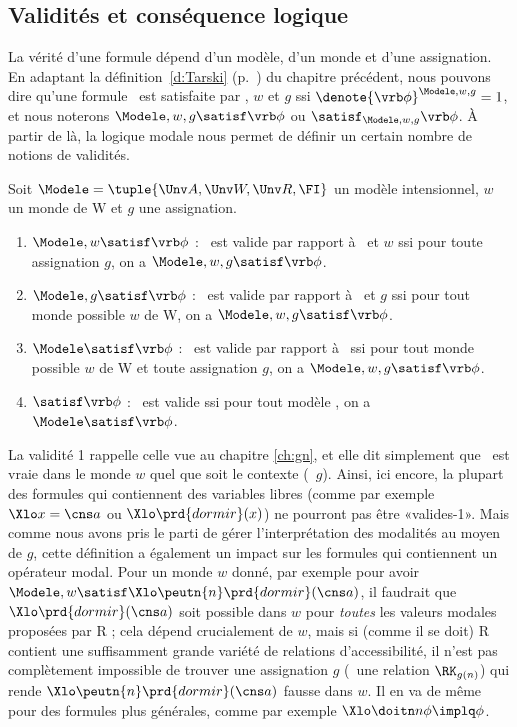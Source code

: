 \subsection{Validités et conséquence logique}
\label{ss:vclw}

La vérité d'une formule dépend d'un modèle, d'un monde et d'une assignation. 
En adaptant la
définition~\ref{d:Tarski} (p.~\pageref{d:Tarski}) du chapitre précédent, nous pouvons dire qu'une formule \vrb\phi\ est satisfaite par \Modele, $w$ et $g$ ssi \(\denote{\vrb\phi}^{\Modele,w,g}=1\), et nous noterons $\Modele,w,g\satisf\vrb\phi$ ou $\satisf_{\Modele,w,g}\vrb\phi$. %
À partir de là, la logique modale nous permet de définir un certain nombre de notions de validités.


\begin{defi}
Soit $\Modele=\tuple{\Unv A,\Unv W,\Unv R,\FI}$ un modèle intensionnel, $w$ un monde de \Unv W et $g$ une assignation.
\begin{enumerate}
\item \(\Modele, w\satisf \vrb\phi\) : \vrb\phi\ est valide par rapport à \Modele\ et $w$ ssi pour toute assignation $g$, on a \(\Modele, w,g\satisf \vrb\phi\).
\item \(\Modele, g\satisf \vrb\phi\) : \vrb\phi\ est valide par rapport à \Modele\ et $g$ ssi pour tout monde possible $w$ de \Unv W, on a \(\Modele, w,g\satisf \vrb\phi\).
\item \(\Modele\satisf \vrb\phi\) : \vrb\phi\ est valide par rapport à \Modele\ ssi pour tout monde possible $w$ de \Unv W et toute assignation $g$, on a \(\Modele, w,g\satisf \vrb\phi\).
\item \(\satisf \vrb\phi\) : \vrb\phi\ est valide  ssi pour tout modèle \Modele, on a \(\Modele\satisf \vrb\phi\).
\end{enumerate}
\end{defi}

\newpage

La validité 1 rappelle celle vue au chapitre \ref{ch:gn}, et elle dit simplement que \vrb\phi\ est vraie dans le monde $w$ quel que soit le contexte (\ie\ $g$).
Ainsi, ici encore, la plupart des formules qui contiennent des variables libres (comme par exemple \(\Xlo x=\cns a\) ou \(\Xlo\prd{dormir}(x)\)) ne pourront pas être «valides-1».  Mais comme nous avons pris le parti de gérer l'interprétation des modalités au moyen de $g$, cette définition a également un impact sur les formules qui contiennent un opérateur modal.  Pour un monde $w$ donné, par exemple pour avoir \(\Modele,w\satisf\Xlo\peutn{n}\prd{dormir}(\cns a)\), il faudrait que $\Xlo\prd{dormir}(\cns a)$ soit possible dans $w$ pour \emph{toutes} les valeurs modales proposées par {\Unv R} ; cela dépend crucialement de $w$, mais si (comme il se doit) \Unv R contient une suffisamment grande variété de relations d'accessibilité, il n'est pas complètement impossible de trouver une assignation $g$ (\ie\ une relation $\RK_{g(n)}$)  qui rende $\Xlo\peutn{n}\prd{dormir}(\cns a)$ fausse dans $w$.  Il en va de même pour des formules plus générales, comme par exemple $\Xlo\doitn n\phi\implq\phi$.

